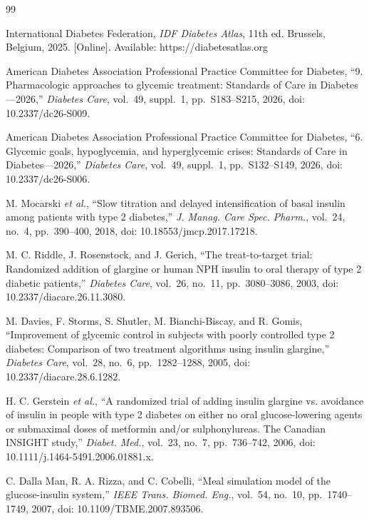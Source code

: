 \documentclass[conference]{IEEEtran}
\begin{document}
\clearpage
\begin{thebibliography}{99}
\footnotesize

 International Diabetes Federation, \emph{IDF Diabetes Atlas}, 11th ed.
Brussels, Belgium, 2025. [Online]. Available: https://diabetesatlas.org

 American Diabetes Association Professional Practice Committee for
Diabetes, ``9. Pharmacologic approaches to glycemic treatment: Standards of Care in
Diabetes---2026,'' \emph{Diabetes Care}, vol.~49, suppl.~1, pp.~S183--S215, 2026, doi:
10.2337/dc26-S009.

 American Diabetes Association Professional Practice Committee for
Diabetes, ``6. Glycemic goals, hypoglycemia, and hyperglycemic crises: Standards of Care in
Diabetes---2026,'' \emph{Diabetes Care}, vol.~49, suppl.~1, pp.~S132--S149, 2026, doi:
10.2337/dc26-S006.

 M. Mocarski \emph{et al.}, ``Slow titration and delayed intensification
of basal insulin among patients with type 2 diabetes,'' \emph{J. Manag. Care Spec. Pharm.},
vol.~24, no.~4, pp.~390--400, 2018, doi: 10.18553/jmcp.2017.17218.

 M. C. Riddle, J. Rosenstock, and J. Gerich, ``The treat-to-target trial:
Randomized addition of glargine or human NPH insulin to oral therapy of type 2 diabetic
patients,'' \emph{Diabetes Care}, vol.~26, no.~11, pp.~3080--3086, 2003, doi:
10.2337/diacare.26.11.3080.

 M. Davies, F. Storms, S. Shutler, M. Bianchi-Biscay, and R. Gomis,
``Improvement of glycemic control in subjects with poorly controlled type 2 diabetes:
Comparison of two treatment algorithms using insulin glargine,'' \emph{Diabetes Care}, vol.~28,
no.~6, pp.~1282--1288, 2005, doi: 10.2337/diacare.28.6.1282.

 H. C. Gerstein \emph{et al.}, ``A randomized trial of adding insulin
glargine vs. avoidance of insulin in people with type 2 diabetes on either no oral
glucose-lowering agents or submaximal doses of metformin and/or sulphonylureas. The Canadian
INSIGHT study,'' \emph{Diabet. Med.}, vol.~23, no.~7, pp.~736--742, 2006, doi:
10.1111/j.1464-5491.2006.01881.x.

 C. Dalla Man, R. A. Rizza, and C. Cobelli, ``Meal simulation model of
the glucose-insulin system,'' \emph{IEEE Trans. Biomed. Eng.}, vol.~54, no.~10,
pp.~1740--1749, 2007, doi: 10.1109/TBME.2007.893506.


\end{thebibliography}
\end{document}
